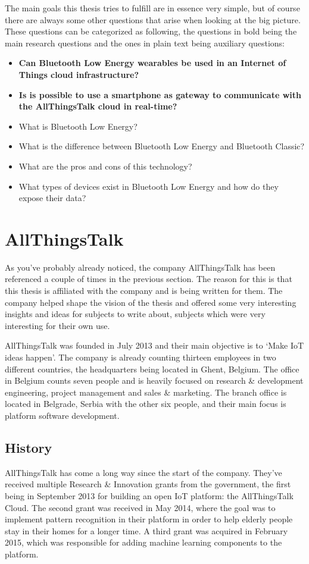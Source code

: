 \documentclass[pdftex,a4paper,12pt,twoside]{report}
\begin{document}
The main goals this thesis tries to fulfill are in essence very simple, but of course there are always some other questions that arise when looking at the big picture. These questions can be categorized as following, the questions in bold being the main research questions and the ones in plain text being auxiliary questions:
\begin{itemize}
	\item{\textbf{Can Bluetooth Low Energy wearables be used in an Internet of Things cloud infrastructure?}}
	\item{\textbf{Is is possible to use a smartphone as gateway to communicate with the AllThingsTalk cloud in real-time?}}
	\item{What is Bluetooth Low Energy?}
	\item{What is the difference between Bluetooth Low Energy and Bluetooth Classic?}
	\item{What are the pros and cons of this technology?}
	\item{What types of devices exist in Bluetooth Low Energy and how do they expose their data?}
\end{itemize}

\section{AllThingsTalk}
\label{sec:allthingstalk}
As you've probably already noticed, the company AllThingsTalk has been referenced a couple of times in the previous section. The reason for this is that this thesis is affiliated with the company and is being written for them. The company helped shape the vision of the thesis and offered some very interesting insights and ideas for subjects to write about, subjects which were very interesting for their own use.

AllThingsTalk was founded in July 2013 and their main objective is to `Make IoT ideas happen'. The company is already counting thirteen employees in two different countries, the headquarters being located in Ghent, Belgium. The office in Belgium counts seven people and is heavily focused on research \& development engineering, project management and sales \& marketing. The branch office is located in Belgrade, Serbia with the other six people, and their main focus is platform software development.

\subsection{History}
\label{subsec:atthistory}
AllThingsTalk has come a long way since the start of the company. They've received multiple Research \& Innovation grants from the government, the first being in September 2013 for building an open IoT platform: the AllThingsTalk Cloud. The second grant was received in May 2014, where the goal was to implement pattern recognition in their platform in order to help elderly people stay in their homes for a longer time. A third grant was acquired in February 2015, which was responsible for adding machine learning components to the platform.
\end{document}
